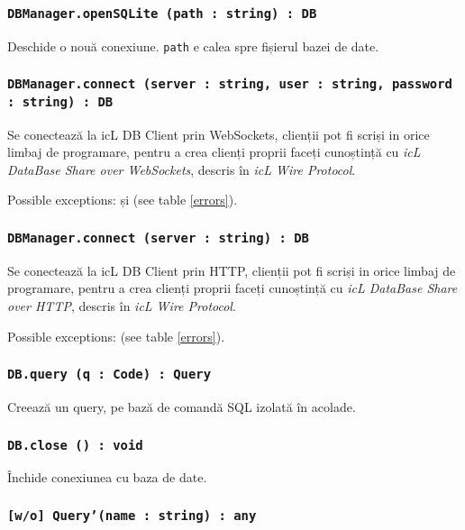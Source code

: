 \subsubsection{\texttt{DBManager.openSQLite (path : string) : DB}}

Deschide o nouă conexiune. \texttt{path} e calea spre fișierul bazei de date.

\subsubsection{\texttt{DBManager.connect (server : string, user : string, password : string) : DB}}

Se conectează la icL DB Client prin WebSockets, clienții pot fi scriși in orice limbaj de programare, pentru a crea clienți proprii faceți cunoștință cu \textit{icL DataBase Share over WebSockets}, descris în \textit{icL Wire Protocol}.

Possible exceptions:  și  (see table \ref{errors}).

\subsubsection{\texttt{DBManager.connect (server : string) : DB}}

Se conectează la icL DB Client prin HTTP, clienții pot fi scriși in orice limbaj de programare, pentru a crea clienți proprii faceți cunoștință cu \textit{icL DataBase Share over HTTP}, descris în \textit{icL Wire Protocol}.

Possible exceptions:  (see table \ref{errors}).

\subsubsection{\texttt{DB.query (q : Code) : Query}}

Creează un query, pe bază de comandă SQL izolată în acolade.

\subsubsection{\texttt{DB.close () : void}}

Închide conexiunea cu baza de date.

\subsubsection{\texttt{[w/o] Query'(name : string) : any}}

